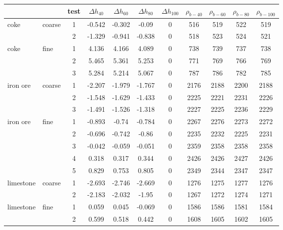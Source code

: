 \begin{table}%
\centering
\begin{tabular}{ll|c|cccc|cccc}
\hline
          &       & test  & $\Delta h_{40}$  & $\Delta h_{60}$  & $\Delta
          h_{80}$  & $\Delta h_{100}$ & $\rho_{b-40}$ & $\rho_{b-60}$ &
          $\rho_{b-80}$ & $\rho_{b-100}$ \\
\hline          
    coke  & coarse & 1     & -0.542 & -0.302 & -0.09 & 0     & 516   & 519   & 522   & 519 \\
          &       & 2     & -1.329 & -0.941 & -0.838 & 0     & 518   & 523   & 524   & 521 \\
\hline 
    coke  & fine  & 1     & 4.136 & 4.166 & 4.089 & 0     & 738   & 739   & 737   & 738 \\
          &       & 2     & 5.465 & 5.361 & 5.253 & 0     & 771   & 769   & 766   & 769 \\
          &       & 3     & 5.284 & 5.214 & 5.067 & 0     & 787   & 786   & 782   & 785 \\
\hline 
    iron ore & coarse & 1     & -2.207 & -1.979 & -1.767 & 0     & 2176  & 2188  & 2200  & 2188 \\
          &       & 2     & -1.548 & -1.629 & -1.433 & 0     & 2225  & 2221  & 2231  & 2226 \\
          &       & 3     & -1.491 & -1.526 & -1.318 & 0     & 2227  & 2225  & 2236  & 2229 \\
\hline 
    iron ore & fine  & 1     & -0.893 & -0.74 & -0.784 & 0     & 2267  & 2276  & 2273  & 2272 \\
          &       & 2     & -0.696 & -0.742 & -0.86 & 0     & 2235  & 2232  & 2225  & 2231 \\
          &       & 3     & -0.042 & -0.059 & -0.051 & 0     & 2359  & 2358  & 2358  & 2358 \\
          &       & 4     & 0.318 & 0.317 & 0.344 & 0     & 2426  & 2426  & 2427  & 2426 \\
          &       & 5     & 0.829 & 0.753 & 0.805 & 0     & 2349  & 2344  & 2347  & 2347 \\
\hline 
    limestone & coarse & 1     & -2.693 & -2.746 & -2.669 & 0     & 1276  & 1275  & 1277  & 1276 \\
          &       & 2     & -2.183 & -2.032 & -1.95 & 0     & 1267  & 1272  & 1274  & 1271 \\
\hline 
    limestone & fine  & 1     & 0.059 & 0.045 & -0.069 & 0     & 1586  & 1586  & 1581  & 1584 \\
          &       & 2     & 0.599 & 0.518 & 0.442 & 0     & 1608  & 1605  & 1602  & 1605 \\

\end{tabular}
\end{table}
